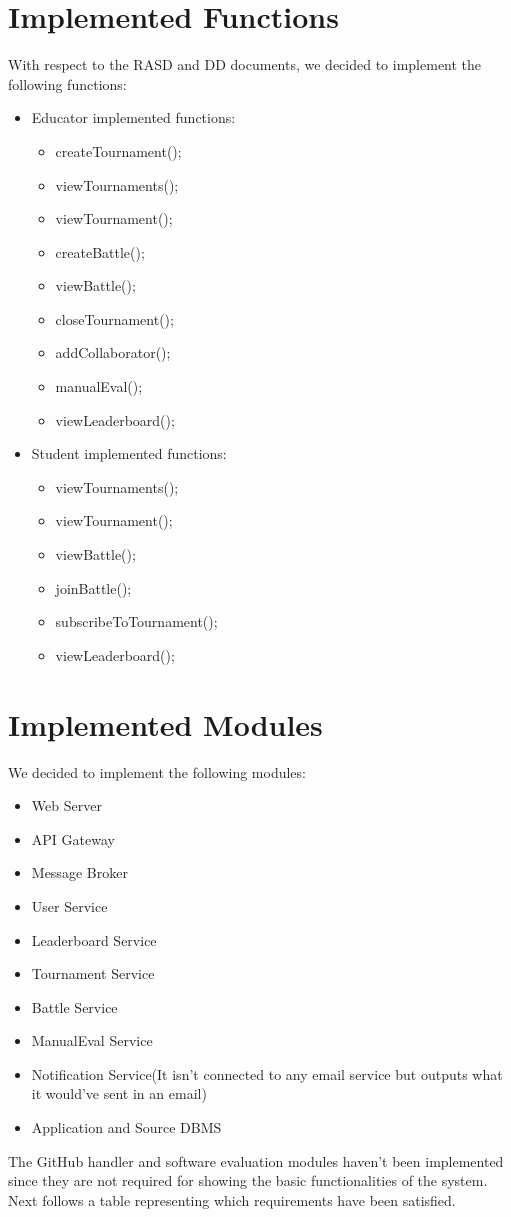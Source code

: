 \section{Implemented Functions}
With respect to the RASD and DD documents, we decided to implement the following functions:
\begin{itemize}
    \item Educator implemented functions:
        \begin{itemize}
            \item createTournament();
            \item viewTournaments();
            \item viewTournament();
            \item createBattle();
            \item viewBattle();
            \item closeTournament();
            \item addCollaborator();
            \item manualEval();
            \item viewLeaderboard();
        \end{itemize}
    \item Student implemented functions:
        \begin{itemize}
            \item viewTournaments();
            \item viewTournament();
            \item viewBattle();
            \item joinBattle();
            \item subscribeToTournament();
            \item viewLeaderboard();
        \end{itemize}
\end{itemize}

\section{Implemented Modules}
We decided to implement the following modules:
\begin{itemize}
    \item Web Server
    \item API Gateway
    \item Message Broker
    \item User Service
    \item Leaderboard Service
    \item Tournament Service
    \item Battle Service
    \item ManualEval Service
    \item Notification Service(It isn't connected to any email service but outputs what it would've sent in an email)
    \item Application and Source DBMS
\end{itemize}
The GitHub handler and software evaluation modules haven't been implemented since they are not required for showing the basic functionalities of the system.
Next follows a table representing which requirements have been satisfied.


